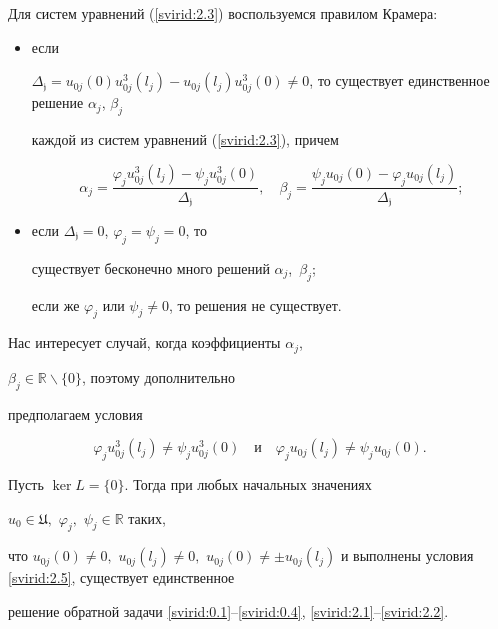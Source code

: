 Для систем уравнений (\ref{svirid:2.3}) воспользуемся правилом Крамера:

\begin{itemize}

    \item [(i)] если

$\mathfrak{\Delta_j}=u_{0j}(0)u_{0j}^3(l_j)-u_{0j}(l_j)u_{0j}^3(0)\neq

0$, то существует единственное ре\-ше\-ние $\alpha_j$, $\beta_j$

каждой из систем уравнений (\ref{svirid:2.3}), причем

\begin{equation}\label{svirid:2.4}

\alpha_j=\frac{\varphi_ju_{0j}^3(l_j)-\psi_ju_{0j}^3(0)}{\mathfrak{\Delta_j}},

\quad

\beta_j=\frac{\psi_ju_{0j}(0)-\varphi_ju_{0j}(l_j)}{\mathfrak{\Delta_j}};

\end{equation}

    \item [(ii)] если $\mathfrak{\Delta_j}=0$, $\varphi_j=\psi_j=0$, то

существует бесконечно много решений $\alpha_j$,~$\beta_j$;

если же $\varphi_j$ или $\psi_j\neq 0$, то решения не существует.

\end{itemize}



Нас интересует случай, когда коэффициенты $\alpha_j$,

$\beta_j\in\mathbb{R}\backslash\{0\}$, поэтому до\-пол\-ни\-тель\-но

предполагаем условия

\begin{equation}\label{svirid:2.5}

\varphi_ju_{0j}^3(l_j)\neq\psi_ju_{0j}^3(0) \quad \mbox{и} \quad

\varphi_ju_{0j}(l_j)\neq\psi_ju_{0j}(0).

\end{equation}

\begin{lemma}[2.1]

Пусть $\ker L=\{0\}.$ Тогда при любых начальных значениях

$u_{0}\in\mathfrak{U},$ $\varphi_j,$ $\psi_j\in\mathbb{R}$ таких{\rm,}

что $u_{0j}(0)\neq 0,$ $u_{0j}(l_j)\neq 0,$ $u_{0j}(0)\neq \pm

u_{0j}(l_j)$ и выполнены условия \eqref{svirid:2.5}, существует единст\-вен\-ное

решение обратной задачи \eqref{svirid:0.1}--\eqref{svirid:0.4}, \eqref{svirid:2.1}--\eqref{svirid:2.2}.

\end{lemma}



